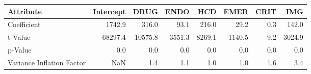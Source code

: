 \begin{tabular}{lrrrrrrr}
\toprule
Attribute &  Intercept &     DRUG &    ENDO &     HCD &    EMER &  CRIT &     IMG \\
\midrule
Coefficient               &     1742.9 &    316.0 &    93.1 &   216.0 &    29.2 &   0.3 &   142.0 \\
t-Value                   &    68297.4 &  10575.8 &  3551.3 &  8269.1 &  1140.5 &   9.2 &  3024.9 \\
p-Value                   &        0.0 &      0.0 &     0.0 &     0.0 &     0.0 &   0.0 &     0.0 \\
Variance Inflation Factor &        NaN &      1.4 &     1.1 &     1.0 &     1.0 &   1.6 &     3.4 \\
\bottomrule
\end{tabular}
